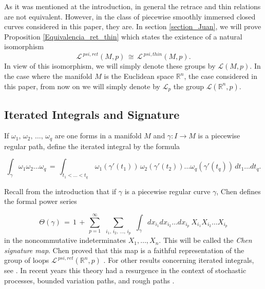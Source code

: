 \documentclass{amsart}
\newcommand{\R}{{\mathbb R}}
\begin{document}
As it was mentioned at the introduction, in general the retrace and thin relations are not equivalent. However, in the class of piecewise smoothly immersed  closed curves considered in this paper, they are. In section \ref{section_Juan}, we will prove Proposition \ref{Equivalencia_ret_thin} which states the existence of a natural isomorphism
$${\mathcal L}^{\ psi,ret}(M,p)\,\cong\, \mathcal{L}^{\ psi,thin}(M,p).$$
In view of this isomorphism, we will simply denote these groups by $\mathcal{L}(M,p)$.  In the case where the manifold $M$ is the Euclidean space $\R^n$, the case considered in this paper, from now on we will simply denote by $\mathcal L_p$ the group $\mathcal{L}(\R^n, p)$.


\subsection{Iterated Integrals and Signature}\label{subsection_Signature}\label{signature_section}
  
If  $\omega_{1},\,  \omega_2,\, \ldots,\,  \omega_q$ are one forms in a manifold $M$ and $\gamma:I\rightarrow M$ is a piecewise regular path, define the iterated integral by the formula

\[   \int_{\gamma}  \omega_{1}  \omega_2 \ldots  \omega_q \,=\, \int_{t_1<\ldots<t_q}\,  \omega_{1}(\gamma'(t_1))\,   \omega_2(\gamma'(t_2))  \ldots  \omega_q(\gamma'(t_q))\,dt_1\ldots dt_q.\]

Recall from the introduction that if $\gamma$ is a piecewise regular curve $\gamma$, Chen \cite{Chen2} defines the formal power series 





\begin{equation}\label{Chen_map}
\Theta(\gamma)\, =\,1\,+\, \sum^{\infty}_{p=1}\,\  \sum_{i_1,\,i_2,\, \ldots,\,i_p}\  \,\int_{\gamma} dx_{i_1}dx_{i_2} \ldots dx_{i_p}\        X_{i_1}X_{i_2} \ldots X_{i_p}
\end{equation}
in the noncommutative indeterminates $X_1, \ldots, X_n$. This will be called the \textit{Chen signature map}. Chen proved that this map is a faithful representation of the group of loops $\mathcal{L}^{\ psi,ret}(\R^n,p)$ \cite{Chen1, Chen2prima, Chen2}. For other results concerning iterated integrals, see \cite{Chen3, Chen4}. In recent years this theory had a resurgence in the context of stochastic processes, 
 bounded variation paths,  and rough paths \cite{Lyons1, Lyons2, Lyons2prima, Lyons3}.
 
\end{document}
